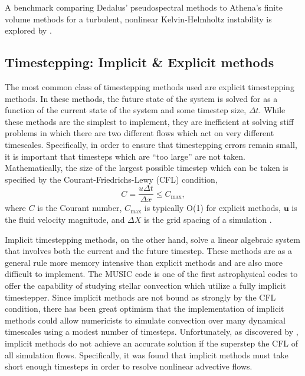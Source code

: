 A benchmark comparing Dedalus' pseudospectral methods to Athena's finite volume methods for a turbulent, nonlinear Kelvin-Helmholtz instability is explored by \citet{Lecoanet_et_al_2016_KH}.


\subsection{Timestepping: Implicit \& Explicit methods}
\label{sct:intro_timestepping}
The most common class of timestepping methods used are explicit timestepping methods.
In these methods, the future state of the system is solved for as a function of the current state of the system and some timestep size, $\Delta t$.
While these methods are the simplest to implement, they are inefficient at solving stiff problems in which there are two different flows which act on very different timescales.
Specifically, in order to ensure that timestepping errors remain small, it is important that timesteps which are ``too large'' are not taken.
Mathematically, the size of the largest possible timestep which can be taken is specified by the Courant-Friedrichs-Lewy (CFL) condition,
\begin{equation}
C = \frac{u \Delta t}{\Delta x} \leq C_{\text{max}},
\end{equation}
where $C$ is the Courant number, $C_{\text{max}}$ is typically O(1) for explicit methods, $\bm{u}$ is the fluid velocity magnitude, and $\Delta X$ is the grid spacing of a simulation \citep{cfl1967}.

Implicit timestepping methods, on the other hand, solve a linear algebraic system that involves both the current and the future timestep.
These methods are as a general rule more memory intensive than explicit methods and are also more difficult to implement.
The MUSIC code is one of the first astrophysical codes to offer the capability of studying stellar convection which utilize a fully implicit timestepper.
Since implicit methods are not bound as strongly by the CFL condition, there has been great optimism that the implementation of implicit methods could allow numericists to simulate convection over many dynamical timescales using a modest number of timesteps.
Unfortunately, as discovered by \citet{viallet&all2011, viallet&all2013, viallet&all2016}, implicit methods do not achieve an accurate solution if the superstep the CFL of all simulation flows.
Specifically, it was found that implicit methods must take short enough timesteps in order to resolve nonlinear advective flows.

